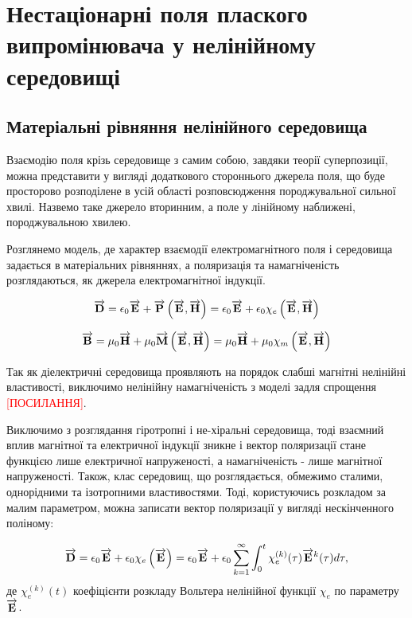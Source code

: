 \chapter{Нестаціонарні поля плаского випромінювача у нелінійному середовищі}
\label{ch:nonlinear}

\section{Матеріальні рівняння нелінійного середовища}

Взаємодію поля крізь середовище з самим собою, завдяки теорії суперпозиції,
можна представити у вигляді додаткового стороннього джерела поля, що буде
просторово розподілене в усій області розповсюдження породжувальної
сильної хвилі. Назвемо таке джерело вторинним, а поле у лінійному наближені,
породжувальною хвилею.

Розглянемо модель, де характер взаємодії електромагнітного поля і середовища 
задається в матеріальних рівняннях, а поляризація та намагніченість 
розглядаються, як джерела електромагнітної індукції.

\begin{equation*}
\overrightarrow{\mathbf D} = \epsilon_0 \overrightarrow{\mathbf E} + \overrightarrow{\mathbf P} \left( \overrightarrow{\mathbf E}, \overrightarrow{\mathbf H} \right) =
\epsilon_0 \overrightarrow{\mathbf E} + \epsilon_0 \chi_e \left( \overrightarrow{\mathbf E}, \overrightarrow{\mathbf H} \right)
\end{equation*}

\begin{equation*}
\overrightarrow{\mathbf B} = \mu_0 \overrightarrow{\mathbf H} + \mu_0 \overrightarrow{\mathbf M} \left( \overrightarrow{\mathbf E}, \overrightarrow{\mathbf H} \right) =
\mu_0 \overrightarrow{\mathbf H} + \mu_0 \chi_m \left( \overrightarrow{\mathbf E}, \overrightarrow{\mathbf H} \right)
\end{equation*}

Так як діелектричні середовища проявляють на порядок слабші магнітні
нелінійні властивості, виключимо нелінійну намагніченість з моделі задля
спрощення \textcolor{red}{[ПОСИЛАННЯ]}.

Виключимо з розглядання гіротропні і не-хіральні середовища, тоді взаємний 
вплив магнітної та електричної індукції зникне і вектор поляризації стане 
функцією лише електричної напруженості, а намагніченість - лише магнітної
напруженості. Також, клас середовищ, що розглядається, обмежимо сталими, 
однорідними та ізотропними властивостями. Тоді, користуючись розкладом за 
малим параметром, можна записати вектор поляризації у вигляді нескінченного 
поліному:

\begin{equation} \label{eq:d_voltera}
\overrightarrow{\mathbf D} = \epsilon_0 \overrightarrow{\mathbf E} + \epsilon_0 \chi_e \left( \overrightarrow{\mathbf E} \right) = 
\epsilon_0 \overrightarrow{\mathbf E} + \epsilon_0 \sum_{k=1}^{\infty} \int_0^t
\chi_e^{(k)} (\tau) \overrightarrow{\mathbf E}^k (\tau) d \tau,
\end{equation}
%
де $\chi_e^{(k)} (t) $ коефіцієнти розкладу Вольтера нелінійної функції 
$ \chi_e $ по параметру $ \overrightarrow{\mathbf E} $.

